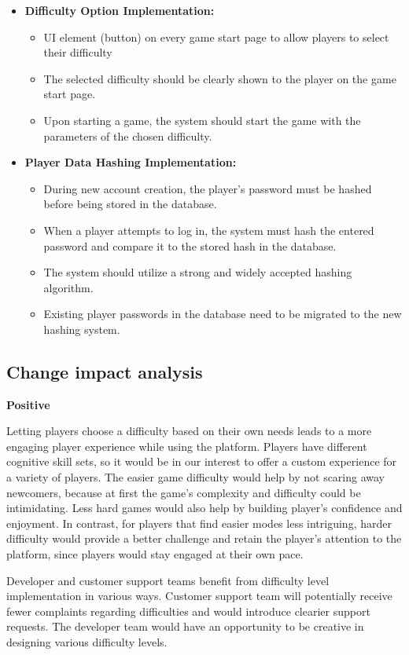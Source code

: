 \documentclass[11pt,a4paper]{article}
\newcommand{\heading}[1]{\vspace{1em}\noindent\textbf{#1}\par\vspace{0.5em}}
\begin{document}
\begin{itemize}
    \item  \textbf{Difficulty Option Implementation:}
    \begin{itemize}
        \item UI element (button) on every game start page to allow players to select their difficulty
        \item The selected difficulty should be clearly shown to the player on the game start page.
        \item Upon starting a game, the system should start the game with the parameters of the chosen difficulty.
    \end{itemize}
    \item  \textbf{Player Data Hashing Implementation:}
    \begin{itemize}
        \item During new account creation, the player's password must be hashed before being stored in the database.
        \item When a player attempts to log in, the system must hash the entered password and compare it to the stored hash in the database.
        \item The system should utilize a strong and widely accepted hashing algorithm.
        \item Existing player passwords in the database need to be migrated to the new hashing system.
    \end{itemize}
\end{itemize}

\subsection{Change impact analysis}
\heading{Positive}
Letting players choose a difficulty based on their own needs leads to a more engaging player experience while using the platform. Players have different cognitive skill sets, so it would be in our interest to offer a custom experience for a variety of players. The easier game difficulty would help by not scaring away newcomers, because at first the game's complexity and difficulty could be intimidating. Less hard games would also help by building player's confidence and enjoyment. In contrast, for players that find easier modes less intriguing, harder difficulty would provide a better challenge and retain the player's attention to the platform, since players would stay engaged at their own pace.

Developer and customer support teams benefit from difficulty level implementation in various ways. Customer support team will potentially receive fewer complaints regarding difficulties and would introduce clearier support requests. The developer team would have an opportunity to be creative in designing various difficulty levels.
\end{document}
